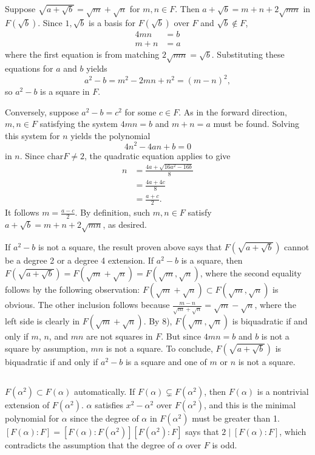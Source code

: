 \documentclass[12pt]{article}
\begin{document}
\subsection{}
Suppose $\sqrt{a + \sqrt{b}} = \sqrt{m} + \sqrt{n}$ for $m, n \in F$. 
Then $a + \sqrt{b} = m + n + 2\sqrt{mn}$ in $F(\sqrt{b})$. 
Since $1, \sqrt{b}$ is a basis for $F(\sqrt{b})$ over $F$ and $\sqrt{b} \notin F$, 
\begin{align*}
  4mn & = b \\
  m + n &  = a 
\end{align*}
where the first equation is from matching $2\sqrt{mn} = \sqrt{b}$. 
Substituting these equations for $a$ and $b$ yields 
$$a^2 - b = m^2 - 2mn + n^2 = (m - n)^2,$$
so $a^2 - b$ is a square in $F$. 

Conversely, suppose $a^2 - b = c^2$ for some $c \in F$. 
As in the forward direction, $m, n \in F$ satisfying the system $4mn = b$ and $m + n = a$ must be found. 
Solving this system for $n$ yields the polynomial 
$$4n^2 - 4an + b = 0$$ 
in $n$. 
Since $\text{char}{F} \neq 2$, the quadratic equation applies to give 
\begin{align*}
  n & = \frac{4a + \sqrt{16a^2 - 16b}}{8} \\ 
    & = \frac{4a + 4c}{8} \\ 
    & = \frac{a + c}{2}.
\end{align*}
It follows $m = \frac{a - c}{2}$. 
By definition, such $m, n \in F$ satisfy $a + \sqrt{b} = m + n + 2\sqrt{mn}$, as desired.  

If $a^2 - b$ is not a square, the result proven above says that $F(\sqrt{a + \sqrt{b}})$ cannot be a degree 2 or a degree 4 extension.
If $a^2 - b$ is a square, then $F(\sqrt{a + \sqrt{b}}) = F(\sqrt{m} + \sqrt{n}) = F(\sqrt{m}, \sqrt{n})$, where the second equality follows by the following observation: 
$F(\sqrt{m} + \sqrt{n}) \subset F(\sqrt{m}, \sqrt{n})$ is obvious. 
The other inclusion follows because $\frac{m - n}{\sqrt{m} + \sqrt{n}} = \sqrt{m} - \sqrt{n}$, where the left side is clearly in $F(\sqrt{m} + \sqrt{n})$. 
By 8), $F(\sqrt{m}, \sqrt{n})$ is biquadratic if and only if $m$, $n$, and $mn$ are not squares in $F$. 
But since $4mn = b$ and $b$ is not a square by assumption, $mn$ is not a square. 
To conclude, $F(\sqrt{a + \sqrt{b}})$ is biquadratic if and only if $a^2 - b$ is a square and one of $m$ or $n$ is not a square. 

\setcounter{subsection}{13}
\subsection{}
$F(\alpha^2) \subset F(\alpha)$ automatically. 
If $F(\alpha) \subsetneq F(\alpha^2)$, then $F(\alpha)$ is a nontrivial extension of $F(\alpha^2)$. 
$\alpha$ satisfies $x^2 - \alpha^2$ over $F(\alpha^2)$, and this is the minimal polynomial for $\alpha$ since the degree of $\alpha$ in $F(\alpha^2)$ must be greater than 1. 
$[F(\alpha) : F] = [F(\alpha) : F(\alpha^2)] [F(\alpha^2) : F]$ says that $2 \mid [F(\alpha) : F]$, which contradicts the assumption that the degree of $\alpha$ over $F$ is odd.  
\end{document}
